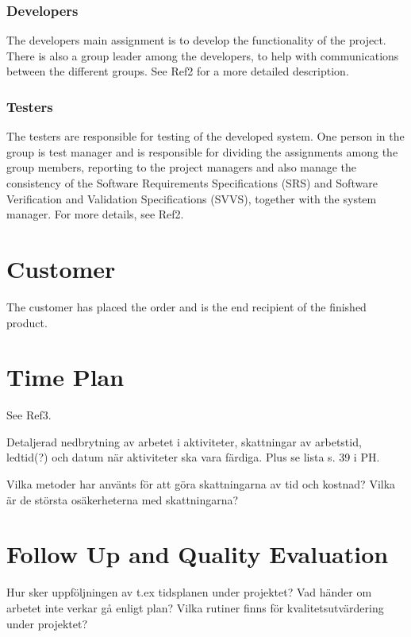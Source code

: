 \documentclass[a4paper]{article}
\begin{document}
\subsubsection{Developers}
The developers main assignment is to develop the functionality of the project. There is also a group leader among the developers, to help with communications between the different groups. See Ref2 for a more detailed description.

\subsubsection{Testers}
The testers are responsible for testing of the developed system. One person in the group is test manager and is responsible for dividing the assignments among the group members, reporting to the project managers and also manage the consistency of the Software Requirements Specifications (SRS) and Software Verification and Validation Specifications (SVVS), together with the system manager. For more details, see Ref2.

\section{Customer}
The customer has placed the order and is the end recipient of the finished product.

\section{Time Plan}
See Ref3.

Detaljerad nedbrytning av arbetet i aktiviteter, skattningar av arbetstid, ledtid(?) och datum när aktiviteter ska vara färdiga. Plus se lista s. 39 i PH.

Vilka metoder har använts för att göra skattningarna av tid och kostnad? Vilka är de största osäkerheterna med skattningarna?


\section{Follow Up and Quality Evaluation}

Hur sker uppföljningen av t.ex tidsplanen under projektet? Vad händer om arbetet inte verkar gå enligt plan? Vilka rutiner finns för kvalitetsutvärdering under projektet?
\end{document}
